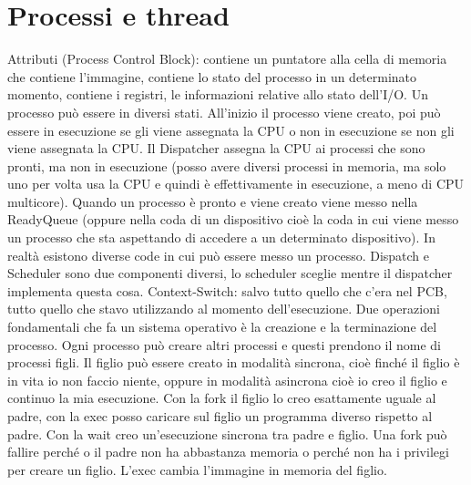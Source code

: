 \section{Processi e thread}
Attributi (Process Control Block): contiene un puntatore alla cella di memoria che contiene l’immagine, contiene lo stato del processo in un determinato momento, contiene i registri, le informazioni relative allo stato dell’I/O. 
Un processo può essere in diversi stati. 
All’inizio il processo viene creato, poi può essere in esecuzione se gli viene assegnata la CPU o non in esecuzione se non gli viene assegnata la CPU. Il Dispatcher assegna la CPU ai processi che sono pronti, ma non in esecuzione (posso 
avere diversi processi in memoria, ma solo uno per volta usa la CPU e quindi è effettivamente in esecuzione, a meno di CPU multicore). Quando un processo è pronto e viene creato viene messo nella ReadyQueue (oppure nella coda di un 
dispositivo cioè la coda in cui viene messo un processo che sta aspettando di accedere a un determinato dispositivo). In realtà esistono diverse code in cui può essere messo un processo. Dispatch e Scheduler sono due componenti diversi, 
lo scheduler sceglie mentre il dispatcher implementa questa cosa. Context-Switch: salvo tutto quello che c’era nel PCB, tutto quello che stavo utilizzando al momento dell’esecuzione. Due operazioni fondamentali che fa un sistema operativo
è la creazione e la terminazione del processo. Ogni processo può creare altri processi e questi prendono il nome di processi figli. Il figlio può essere creato in modalità sincrona, cioè finché il figlio è in vita io non faccio niente, 
oppure in modalità asincrona cioè io creo il figlio e continuo la mia esecuzione. Con la fork il figlio lo creo esattamente uguale al padre, con la exec posso caricare sul figlio un programma diverso rispetto al padre. Con la wait creo 
un’esecuzione sincrona tra padre e figlio. Una fork può fallire perché o il padre non ha abbastanza memoria o perché non ha i privilegi per creare un figlio. L’exec cambia l’immagine in memoria del figlio. 
